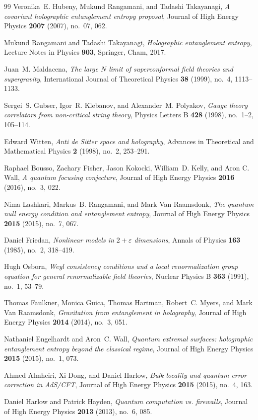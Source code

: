 \begin{thebibliography}{99}
Veronika~E. Hubeny, Mukund Rangamani, and Tadashi Takayanagi, \emph{A covariant holographic entanglement entropy proposal}, Journal of High Energy Physics \textbf{2007} (2007), no.~07, 062.

Mukund Rangamani and Tadashi Takayanagi, \emph{Holographic entanglement entropy}, Lecture Notes in Physics \textbf{903}, Springer, Cham, 2017.

Juan~M. Maldacena, \emph{The large $N$ limit of superconformal field theories and supergravity}, International Journal of Theoretical Physics \textbf{38} (1999), no.~4, 1113--1133.

Sergei~S. Gubser, Igor~R. Klebanov, and Alexander~M. Polyakov, \emph{Gauge theory correlators from non-critical string theory}, Physics Letters B \textbf{428} (1998), no.~1--2, 105--114.

Edward Witten, \emph{Anti de Sitter space and holography}, Advances in Theoretical and Mathematical Physics \textbf{2} (1998), no.~2, 253--291.

Raphael Bousso, Zachary Fisher, Jason Kokocki, William~D. Kelly, and Aron C. Wall, \emph{A quantum focusing conjecture}, Journal of High Energy Physics \textbf{2016} (2016), no.~3, 022.

Nima Lashkari, Markus~B. Rangamani, and Mark Van Raamsdonk, \emph{The quantum null energy condition and entanglement entropy}, Journal of High Energy Physics \textbf{2015} (2015), no.~7, 067.

Daniel Friedan, \emph{Nonlinear models in $2+\varepsilon$ dimensions}, Annals of Physics \textbf{163} (1985), no.~2, 318--419.

Hugh Osborn, \emph{Weyl consistency conditions and a local renormalization group equation for general renormalizable field theories}, Nuclear Physics B \textbf{363} (1991), no.~1, 53--79.

Thomas Faulkner, Monica Guica, Thomas Hartman, Robert~C. Myers, and Mark Van Raamsdonk, \emph{Gravitation from entanglement in holography}, Journal of High Energy Physics \textbf{2014} (2014), no.~3, 051.

Nathaniel Engelhardt and Aron~C. Wall, \emph{Quantum extremal surfaces: holographic entanglement entropy beyond the classical regime}, Journal of High Energy Physics \textbf{2015} (2015), no.~1, 073.

Ahmed Almheiri, Xi Dong, and Daniel Harlow, \emph{Bulk locality and quantum error correction in AdS/CFT}, Journal of High Energy Physics \textbf{2015} (2015), no.~4, 163.

Daniel Harlow and Patrick Hayden, \emph{Quantum computation vs. firewalls}, Journal of High Energy Physics \textbf{2013} (2013), no.~6, 085.

\end{thebibliography}
